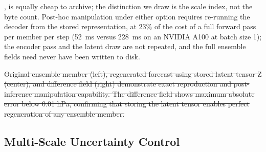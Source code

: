 \documentclass{agujournal2019}
\providecommand{\DIFdel}[1]{{\protect\color{red}\sout{#1}}}                      %
\providecommand{\DIFaddend}{} %
\providecommand{\DIFdelbegin}{} %
\providecommand{\DIFdelend}{} %
\providecommand{\DIFdelFL}[1]{\DIFdel{#1}} %
\begin{document}
{{\cite{alet2024fgn}}\hskip0pt%
, is equally cheap to archive; the distinction we draw is the scale index, not the byte count. Post-hoc manipulation under either option requires re-running the decoder from the stored representation, at 23\% of the cost of a full forward pass per member per step (52~ms versus 228~ms on an NVIDIA A100 at batch size 1); the encoder pass and the latent draw are not repeated, and the full ensemble fields need never have been written to disk.
}\DIFaddend 


\DIFdelbegin %
{%
\DIFdelFL{Original ensemble member (left), regenerated forecast using stored latent tensor Z (center), and difference field (right) demonstrate exact reproduction and post-inference manipulation capability. The difference field shows maximum
absolute error below 0.01 hPa, confirming that storing the latent tensor enables perfect regeneration of any ensemble member.}}

\DIFdelend \subsection{Multi-Scale Uncertainty Control}
\label{sec:multi_scale_control}

\end{document}
